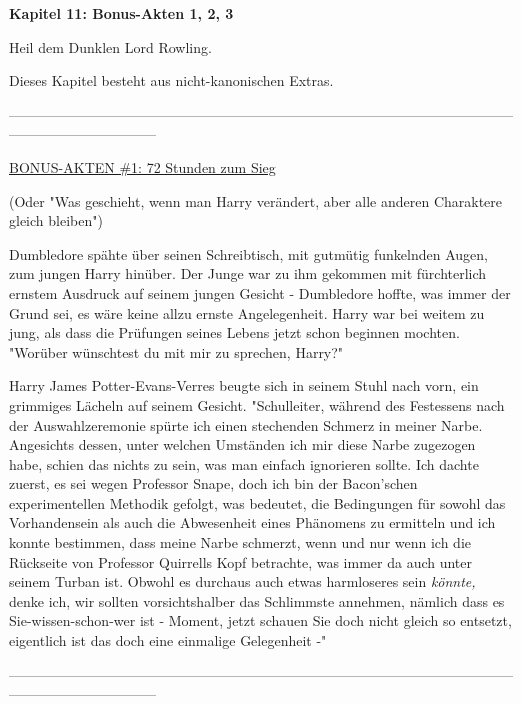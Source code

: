 

\hypertarget{bonus-akten-1-2-3}{%

\textbf{Kapitel 11: Bonus-Akten 1, 2, 3\\ }

Heil dem Dunklen Lord Rowling.

Dieses Kapitel besteht aus nicht-kanonischen Extras.

--------------------------------------------------------------------------------------------------------------------------------------------

\uline{BONUS-AKTEN \#1: 72 Stunden zum Sieg}

(Oder "Was geschieht, wenn man Harry verändert, aber alle anderen Charaktere gleich bleiben")

Dumbledore spähte über seinen Schreibtisch, mit gutmütig funkelnden Augen, zum jungen Harry hinüber. Der Junge war zu ihm gekommen mit fürchterlich ernstem Ausdruck auf seinem jungen Gesicht - Dumbledore hoffte, was immer der Grund sei, es wäre keine allzu ernste Angelegenheit. Harry war bei weitem zu jung, als dass die Prüfungen seines Lebens jetzt schon beginnen mochten. "Worüber wünschtest du mit mir zu sprechen, Harry?"

Harry James Potter-Evans-Verres beugte sich in seinem Stuhl nach vorn, ein grimmiges Lächeln auf seinem Gesicht. "Schulleiter, während des Festessens nach der Auswahlzeremonie spürte ich einen stechenden Schmerz in meiner Narbe. Angesichts dessen, unter welchen Umständen ich mir diese Narbe zugezogen habe, schien das nichts zu sein, was man einfach ignorieren sollte. Ich dachte zuerst, es sei wegen Professor Snape, doch ich bin der Bacon'schen experimentellen Methodik gefolgt, was bedeutet, die Bedingungen für sowohl das Vorhandensein als auch die Abwesenheit eines Phänomens zu ermitteln und ich konnte bestimmen, dass meine Narbe schmerzt, wenn und nur wenn ich die Rückseite von Professor Quirrells Kopf betrachte, was immer da auch unter seinem Turban ist. Obwohl es durchaus auch etwas harmloseres sein \emph{könnte,} denke ich, wir sollten vorsichtshalber das Schlimmste annehmen, nämlich dass es Sie-wissen-schon-wer ist - Moment, jetzt schauen Sie doch nicht gleich so entsetzt, eigentlich ist das doch eine einmalige Gelegenheit -"

--------------------------------------------------------------------------------------------------------------------------------------------

}
